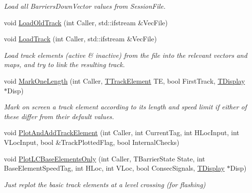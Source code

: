 \begin{DoxyCompactItemize}
\begin{DoxyCompactList}\small\item\em Load all Barriers\+Down\+Vector values from Session\+File. \end{DoxyCompactList}\item 
void \mbox{\hyperlink{class_t_track_abff18c1d577e257279c816da8868f232}{Load\+Old\+Track}} (int Caller, std\+::ifstream \&Vec\+File)
\item 
\mbox{\label{class_t_track_adcd1d019cbdb0d0dbfa44a41dc98ba07}} 
void \mbox{\hyperlink{class_t_track_adcd1d019cbdb0d0dbfa44a41dc98ba07}{Load\+Track}} (int Caller, std\+::ifstream \&Vec\+File)
\begin{DoxyCompactList}\small\item\em Load track elements (active \& inactive) from the file into the relevant vectors and maps, and try to link the resulting track. \end{DoxyCompactList}\item 
\mbox{\label{class_t_track_a6cab5ab84e10504ef1c9d39e931d42fe}} 
void \mbox{\hyperlink{class_t_track_a6cab5ab84e10504ef1c9d39e931d42fe}{Mark\+One\+Length}} (int Caller, \mbox{\hyperlink{class_t_track_element}{T\+Track\+Element}} TE, bool First\+Track, \mbox{\hyperlink{class_t_display}{T\+Display}} $\ast$Disp)
\begin{DoxyCompactList}\small\item\em Mark on screen a track element according to its length and speed limit if either of these differ from their default values. \end{DoxyCompactList}\item 
void \mbox{\hyperlink{class_t_track_a608674798cf48d88d614c8817566126e}{Plot\+And\+Add\+Track\+Element}} (int Caller, int Current\+Tag, int H\+Loc\+Input, int V\+Loc\+Input, bool \&Track\+Plotted\+Flag, bool Internal\+Checks)
\item 
\mbox{\label{class_t_track_a9baeb3f155bea71ef42f09c276707562}} 
void \mbox{\hyperlink{class_t_track_a9baeb3f155bea71ef42f09c276707562}{Plot\+L\+C\+Base\+Elements\+Only}} (int Caller, T\+Barrier\+State State, int Base\+Element\+Speed\+Tag, int H\+Loc, int V\+Loc, bool Consec\+Signals, \mbox{\hyperlink{class_t_display}{T\+Display}} $\ast$Disp)
\begin{DoxyCompactList}\small\item\em Just replot the basic track elements at a level crossing (for flashing) \end{DoxyCompactList}\item 

\end{DoxyCompactItemize}
